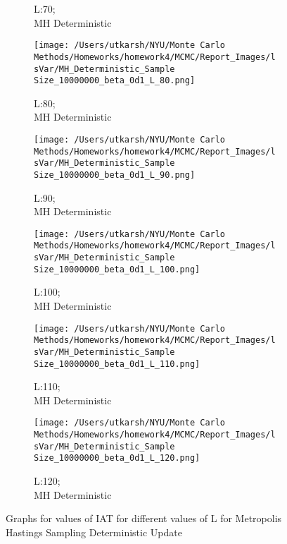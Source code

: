 \documentclass[11pt]{article}
\begin{document}
\begin{figure}[H]
\begin{subfigure}{.20\textwidth}
		\caption{L:70;\\MH Deterministic}
	\end{subfigure}
	\begin{subfigure}{.20\textwidth}
		\texttt{[image: /Users/utkarsh/NYU/Monte Carlo Methods/Homeworks/homework4/MCMC/Report\_Images/lsVar/MH\_Deterministic\_Sample Size\_10000000\_beta\_0d1\_L\_80.png]}
		\caption{L:80;\\MH Deterministic}
	\end{subfigure}
	\begin{subfigure}{.20\textwidth}
		\texttt{[image: /Users/utkarsh/NYU/Monte Carlo Methods/Homeworks/homework4/MCMC/Report\_Images/lsVar/MH\_Deterministic\_Sample Size\_10000000\_beta\_0d1\_L\_90.png]}
		\caption{L:90;\\MH Deterministic}
	\end{subfigure}
	\begin{subfigure}{.20\textwidth}
		\texttt{[image: /Users/utkarsh/NYU/Monte Carlo Methods/Homeworks/homework4/MCMC/Report\_Images/lsVar/MH\_Deterministic\_Sample Size\_10000000\_beta\_0d1\_L\_100.png]}
		\caption{L:100;\\MH Deterministic}
	\end{subfigure}
	\begin{subfigure}{.20\textwidth}
		\texttt{[image: /Users/utkarsh/NYU/Monte Carlo Methods/Homeworks/homework4/MCMC/Report\_Images/lsVar/MH\_Deterministic\_Sample Size\_10000000\_beta\_0d1\_L\_110.png]}
		\caption{L:110;\\MH Deterministic}
	\end{subfigure}
	\begin{subfigure}{.20\textwidth}
		\texttt{[image: /Users/utkarsh/NYU/Monte Carlo Methods/Homeworks/homework4/MCMC/Report\_Images/lsVar/MH\_Deterministic\_Sample Size\_10000000\_beta\_0d1\_L\_120.png]}
		\caption{L:120;\\MH Deterministic}
	\end{subfigure}
    \caption{Graphs for values of IAT for different values of L for Metropolis Hastings Sampling Deterministic Update}
\label{fig:iat_ls_mh_deterministic}
\end{figure}
\end{document}
